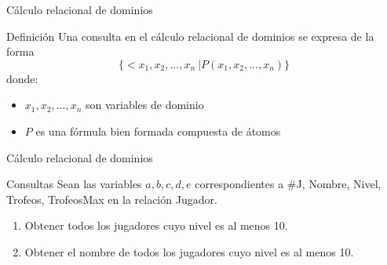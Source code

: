 \begin{frame}{C\'alculo relacional de dominios}
    \begin{block}{Definici\'on}
        Una consulta en el c\'alculo relacional de dominios se
        expresa de la forma
        $$
            \{<x_1,x_2,...,x_n\> | P(x_1,x_2,...,x_n)\}
        $$
        donde: \begin{itemize}
            \item $x_1,x_2,...,x_n$ son variables de dominio
            \item $P$ es una f\'ormula bien formada compuesta de \'atomos
        \end{itemize}
    \end{block}
\end{frame}


\begin{frame}{C\'alculo relacional de dominios}

    \begin{block}{Consultas}
        Sean las variables $a, b, c ,d ,e$ correspondientes a \#J, Nombre, Nivel, Trofeos, TrofeosMax en la relaci\'on Jugador.

        \begin{enumerate}
            \item Obtener todos los jugadores cuyo nivel es al menos 10.
            \item<3-> Obtener el nombre de todos los jugadores cuyo nivel es al menos 10.
        \end{enumerate}
    \end{block}

\end{frame}


